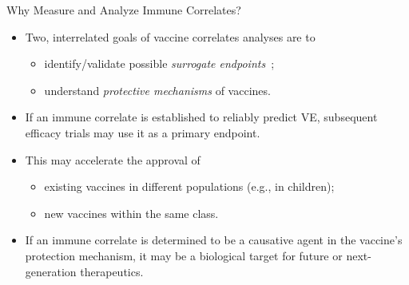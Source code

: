\documentclass{beamer}
\begin{document}

\begin{frame}[c]{Why Measure and Analyze Immune Correlates?}

\begin{center}
\begin{itemize}
  \itemsep8pt
  \item Two, interrelated goals of vaccine correlates analyses are to
    \begin{itemize}
      \itemsep0pt
      \item identify/validate possible \textit{surrogate
        endpoints}~\citep{prentice1989surrogate};
      \item understand \textit{protective mechanisms} of vaccines.
    \end{itemize}
  \item If an immune correlate is established to reliably predict VE,
    subsequent efficacy trials may use it as a primary endpoint.
  \item This may accelerate the approval of
    \begin{itemize}
      \itemsep0pt
      \item existing vaccines in different populations (e.g., in children);
      \item new vaccines within the same class.
    \end{itemize}
  \item If an immune correlate is determined to be a causative agent in the
    vaccine's protection mechanism, it may be a biological target for future
    or next-generation therapeutics.
\end{itemize}
\end{center}

\note{
}

\end{frame}

\end{document}
